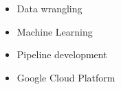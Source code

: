 %
%
%

\twocolumnsection
{
\begin{skills}
\end{skills}}
{
\vspace{1em}
\begin{itemize}
    \item Data wrangling
    \item Machine Learning
    \item Pipeline development
    \item Google Cloud Platform
\end{itemize}
}
